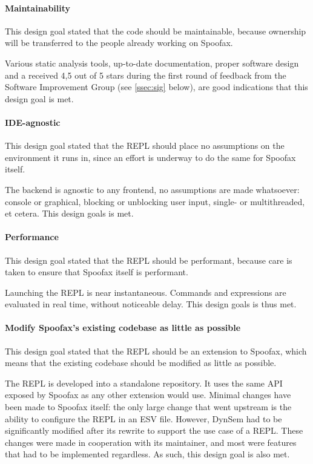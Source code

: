 \paragraph{Maintainability} This design goal stated that the code should be
maintainable, because ownership will be transferred to the people already
working on Spoofax.

Various static analysis tools, up-to-date documentation, proper software design
and a received 4,5 out of 5 stars during the first round of feedback from the
Software Improvement Group (see \cref{ssec:sig} below), are good indications that
this design goal is met.

\paragraph{IDE-agnostic} This design goal stated that the REPL should place no
assumptions on the environment it runs in, since an effort is underway to do the
same for Spoofax itself.

The backend is agnostic to any frontend, no assumptions are made whatsoever:
console or graphical, blocking or unblocking user input, single- or
multithreaded, et cetera. This design goals is met.

\paragraph{Performance} This design goal stated that the REPL should be
performant, because care is taken to ensure that Spoofax itself is performant.

Launching the REPL is near instantaneous. Commands and expressions are evaluated
in real time, without noticeable delay. This design goals is thus met.

\paragraph{Modify Spoofax's existing codebase as little as possible} This design
goal stated that the REPL should be an extension to Spoofax, which means that
the existing codebase should be modified as little as possible.

The REPL is developed into a standalone repository. It uses the same API exposed
by Spoofax as any other extension would use. Minimal changes have been made to
Spoofax itself: the only large change that went upstream is the ability to
configure the REPL in an ESV file. However, DynSem had to be significantly
modified after its rewrite to support the use case of a REPL. These changes were
made in cooperation with its maintainer, and most were features that had to be
implemented regardless. As such, this design goal is also met.


